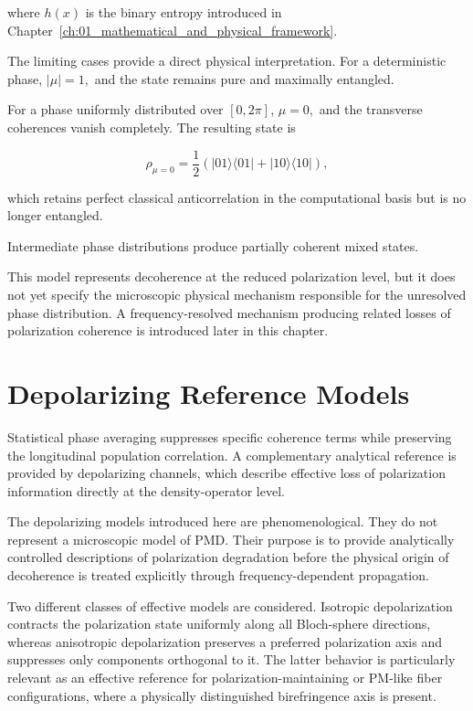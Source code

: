 where \(h(x)\) is the binary entropy introduced in
Chapter~\ref{ch:01_mathematical_and_physical_framework}.

The limiting cases provide a direct physical interpretation. For a deterministic
phase,
\(
|\mu|=1,
\)
and the state remains pure and maximally entangled. 

For a phase uniformly distributed over \( [0,2\pi] \),
\(
\mu=0,
\)
and the transverse coherences vanish completely. The resulting state is

\begin{equation}
\rho_{\mu=0}
=
\frac{1}{2}
\left(
|01\rangle\langle01|
+
|10\rangle\langle10|
\right),
\label{eq:fully_dephased_bell_state}
\end{equation}

which retains perfect classical anticorrelation in the computational basis but is
no longer entangled.

Intermediate phase distributions produce partially coherent mixed states.

This model represents decoherence at the reduced polarization level, but it does
not yet specify the microscopic physical mechanism responsible for the unresolved
phase distribution. A frequency-resolved mechanism producing related losses of
polarization coherence is introduced later in this chapter.


\section{Depolarizing Reference Models}
\label{sec:depolarizing_reference_models}

Statistical phase averaging suppresses specific coherence terms while preserving
the longitudinal population correlation. A complementary analytical reference is
provided by depolarizing channels, which describe effective loss of polarization
information directly at the density-operator level.

The depolarizing models introduced here are phenomenological. They do not
represent a microscopic model of PMD. Their purpose is to provide analytically
controlled descriptions of polarization degradation before the physical origin of
decoherence is treated explicitly through frequency-dependent propagation.

Two different classes of effective models are considered. Isotropic depolarization
contracts the polarization state uniformly along all Bloch-sphere directions,
whereas anisotropic depolarization preserves a preferred polarization axis and
suppresses only components orthogonal to it. The latter behavior is particularly
relevant as an effective reference for polarization-maintaining or PM-like fiber
configurations, where a physically distinguished birefringence axis is present.

